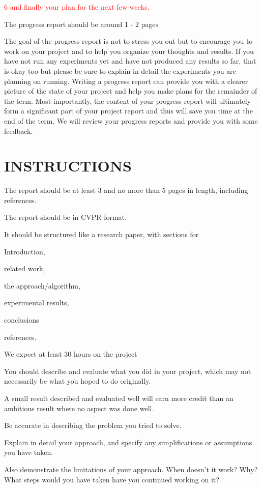 \documentclass[10pt,twocolumn,letterpaper]{article}
\begin{document}
\textcolor{red}{6 and finally your plan for the next few weeks. }

The progress report should be around 1 - 2 pages

The goal of the progress report is not to stress you out but to encourage you to work on
your project and to help you organize your thoughts and results. If you have not run any
experiments yet and have not produced any results so far, that is okay too but please be sure
to explain in detail the experiments you are planning on running. Writing a progress report
can provide you with a clearer picture of the state of your project and help you make plans
for the remainder of the term. Most importantly, the content of your progress report will
ultimately form a significant part of your project report and thus will save you time at the
end of the term. We will review your progress reports and provide you with some feedback.

\section{INSTRUCTIONS}
\label{sec:instruct}


The report should be at least 3 and no more than 5 pages in length, including references.

The report should be in CVPR format. 

It should be structured like a research paper, with sections for 

Introduction,

related work, 

the approach/algorithm, 

experimental results, 

conclusions

references. 

We expect at least 30 hours on the project


You should describe and evaluate what you did in your project, which may not necessarily be what you hoped to do originally. 

A small result described and evaluated well will earn more credit than an ambitious result where no aspect was done well. 

Be accurate in describing the problem you tried to solve. 

Explain in detail your approach, and specify any simplifications or assumptions you have taken. 

Also demonstrate the limitations of your approach. When doesn’t it work? Why? What steps would you have taken have you continued working on it? 
\end{document}

